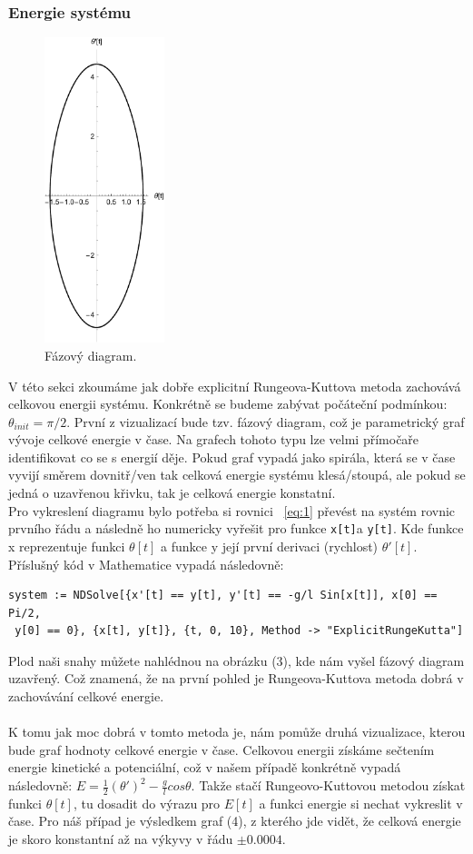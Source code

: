 \documentclass[reqno, a4paper]{amsart}
\begin{document}
\subsubsection{Energie systému}
\label{sec:sys-energy}
\begin{figure}
\includegraphics[width=3.5cm]{Runge - Kutta, Fazovy diagram}
\caption{Fázový diagram.}
\end{figure}
V této sekci zkoumáme jak dobře explicitní Rungeova-Kuttova metoda zachovává celkovou energii systému. Konkrétně se budeme zabývat počáteční podmínkou: $\theta_{init} = \pi /2$. První z vizualizací bude tzv. fázový diagram, což je parametrický graf vývoje celkové energie v čase. Na grafech tohoto typu lze velmi přímočaře identifikovat co se s energií děje. Pokud graf vypadá jako spirála, která se v čase vyvijí směrem dovnitř/ven tak celková energie systému klesá/stoupá, ale pokud se jedná o uzavřenou křivku, tak je celková energie konstatní.\\
Pro vykreslení diagramu bylo potřeba si rovnici ~\eqref{eq:1} převést na systém rovnic prvního řádu a následně ho numericky vyřešit pro funkce \verb|x[t]|a \verb|y[t]|. Kde funkce x reprezentuje funkci $\theta [t]$ a funkce y její první derivaci (rychlost) $\theta' [t]$. Příslušný kód v Mathematice vypadá následovně:
\begin{verbatim}
system := NDSolve[{x'[t] == y[t], y'[t] == -g/l Sin[x[t]], x[0] == Pi/2,
 y[0] == 0}, {x[t], y[t]}, {t, 0, 10}, Method -> "ExplicitRungeKutta"]
\end{verbatim}
Plod naši snahy můžete nahlédnou na obrázku (3), kde nám vyšel fázový diagram uzavřený. Což znamená, že na první pohled je Rungeova-Kuttova metoda dobrá v zachovávání celkové energie.\\ \\
K tomu jak moc dobrá v tomto metoda je, nám pomůže druhá vizualizace, kterou bude graf hodnoty celkové energie v čase. Celkovou energii získáme sečtením energie kinetické a potenciální, což v našem případě konkrétně vypadá následovně: $E = \frac{1}{2} (\theta')^2 - \frac{g}{l} cos \theta$. Takže stačí Rungeovo-Kuttovou metodou získat funkci $\theta[t]$, tu dosadit do výrazu pro $E[t]$ a funkci energie si nechat vykreslit v čase. Pro náš případ je výsledkem graf (4), z kterého jde vidět, že celková energie je skoro konstantní až na výkyvy v řádu $\pm 0.0004$.
\end{document}
